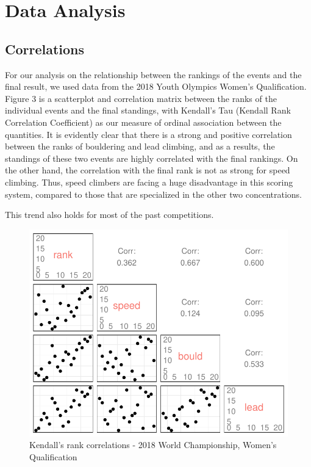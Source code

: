 \documentclass[12pt]{article}
\begin{document}
\hypertarget{data-analysis}{%
\section{Data Analysis}\label{data-analysis}}

\hypertarget{correlations}{%
\subsection{Correlations}\label{correlations}}

For our analysis on the relationship between the rankings of the events
and the final result, we used data from the 2018 Youth Olympics Women's
Qualification. Figure 3 is a scatterplot and correlation matrix between
the ranks of the individual events and the final standings, with
Kendall's Tau (Kendall Rank Correlation Coefficient) as our measure of
ordinal association between the quantities. It is evidently clear that
there is a strong and positive correlation between the ranks of
bouldering and lead climbing, and as a results, the standings of these
two events are highly correlated with the final rankings. On the other
hand, the correlation with the final rank is not as strong for speed
climbing. Thus, speed climbers are facing a huge disadvantage in this
scoring system, compared to those that are specialized in the other two
concentrations.

This trend also holds for most of the past competitions.

\begin{figure}[H]
\centering
\includegraphics{draft_files/figure-latex/unnamed-chunk-10-1.pdf}
\caption{Kendall's rank correlations - 2018 World Championship, Women's
Qualification}
\end{figure}
\end{document}
